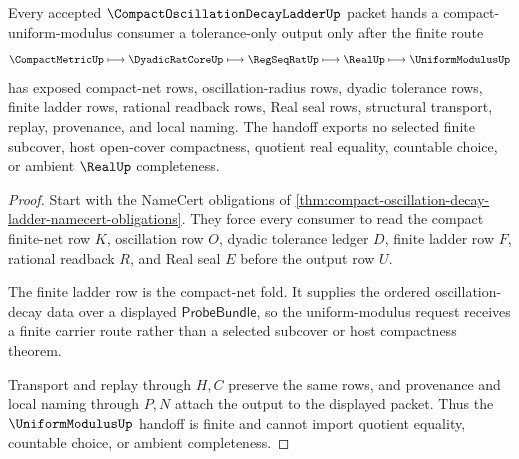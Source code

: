 \begin{theorem}
\label{thm:compact-oscillation-decay-ladder-uniform-modulus-handoff}
Every accepted $\CompactOscillationDecayLadderUp$ packet hands a compact-uniform-modulus consumer a tolerance-only output only after the finite route
$$
\CompactMetricUp \longmapsto \DyadicRatCoreUp \longmapsto \RegSeqRatUp \longmapsto \RealUp \longmapsto \UniformModulusUp
$$
has exposed compact-net rows, oscillation-radius rows, dyadic tolerance rows, finite ladder rows, rational readback rows, Real seal rows, structural transport, replay, provenance, and local naming. The handoff exports no selected finite subcover, host open-cover compactness, quotient real equality, countable choice, or ambient $\RealUp$ completeness.
\end{theorem}
\begin{proof}
Start with the NameCert obligations of \autoref{thm:compact-oscillation-decay-ladder-namecert-obligations}. They force every consumer to read the compact finite-net row $K$, oscillation row $O$, dyadic tolerance ledger $D$, finite ladder row $F$, rational readback $R$, and Real seal $E$ before the output row $U$.

The finite ladder row is the compact-net fold. It supplies the ordered oscillation-decay data over a displayed $\mathsf{ProbeBundle}$, so the uniform-modulus request receives a finite carrier route rather than a selected subcover or host compactness theorem.

Transport and replay through $H,C$ preserve the same rows, and provenance and local naming through $P,N$ attach the output to the displayed packet. Thus the $\UniformModulusUp$ handoff is finite and cannot import quotient equality, countable choice, or ambient completeness.
\end{proof}




